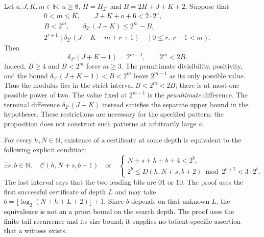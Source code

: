 \begin{prop}\label{prop:TE-02-inv}
Let $a,J,K,m\in\mathbb N$, $a\ge8$, $H=H_{2^a}$ and
$B=2H+J+K+2$. Suppose that
\[
\begin{gathered}
 0<m\le K,\qquad J+K+a+6<2\cdot2^a,\\
 B<2^m,\qquad \delta_{2^a}(J+K)\le2^m-B,\\
 2^{r+1}\mid\delta_{2^a}(J+K-m+r+1)
       \quad(0\le r,\ r+1<m).
\end{gathered}
\]
Then
\[
 \delta_{2^a}(J+K-1)=2^{m-1},\qquad 2^m<2B.
\]
Indeed, $B\ge4$ and $B<2^m$ force $m\ge3$. The penultimate
divisibility, positivity, and the bound
$\delta_{2^a}(J+K-1)<B<2^m$ leave $2^{m-1}$ as its only possible
value. Thus the modulus lies in the strict interval $B<2^m<2B$;
there is at most one possible power of two. The value fixed at
$2^{m-1}$ is the \emph{penultimate} difference. The terminal
difference $\delta_{2^a}(J+K)$ instead satisfies the separate upper
bound in the hypotheses. These restrictions are necessary for the
specified pattern; the proposition does not construct such patterns
at arbitrarily large $a$.
\end{prop}

\begin{prop}\label{prop:TE-03-inv}
For every $h,N\in\mathbb N$, existence of a certificate at some
depth is equivalent to the following explicit condition:
\[
 \exists s,b\in\mathbb N,\quad
 \mathcal C(h,N+s,b+1)\quad\text{or}\quad
 \begin{cases}
  N+s+h+b+4<2^b,\\
  2^b\le D(h,N+s,b+2)\bmod2^{b+2}<3\cdot2^b.
 \end{cases}
\]
The last interval says that the two leading bits are $01$ or $10$.
The proof uses the first successful certificate of depth $L$ and may
take $b=\lfloor\log_2(N+h+L+2)\rfloor+1$. Since $b$ depends on that
unknown $L$, the equivalence is not an a priori bound on the search
depth. The proof uses the finite tail recurrence and its size bound;
it supplies no totient-specific assertion that a witness exists.
\end{prop}

